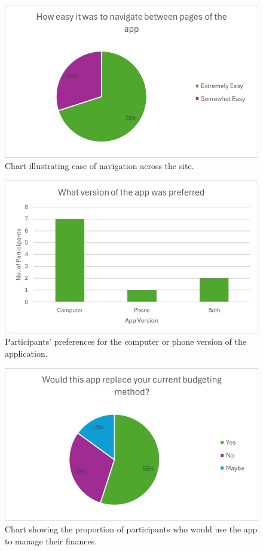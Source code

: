 \documentclass{l4proj}
\begin{document}
\begin{appendices}
\begin{figure}[H]
    \centering
    \includegraphics[width=0.75\linewidth]{images/Evaluation-Charts/ease-navigation.png}
    \caption{Chart illustrating ease of navigation across the site.}
    \label{fig:enter-label}
\end{figure}

\begin{figure}[H]
    \centering
    \includegraphics[width=0.75\linewidth]{images/Evaluation-Charts/preferred-version.png}
    \caption{Participants' preferences for the computer or phone version of the application.}
    \label{fig:enter-label}
\end{figure}

\begin{figure}[H]
    \centering
    \includegraphics[width=0.75\linewidth]{images/Evaluation-Charts/replace-method.png}
    \caption{Chart showing the proportion of participants who would use the app to manage their finances.}
    \label{fig:enter-label}
\end{figure}


\end{appendices}
\end{document}
